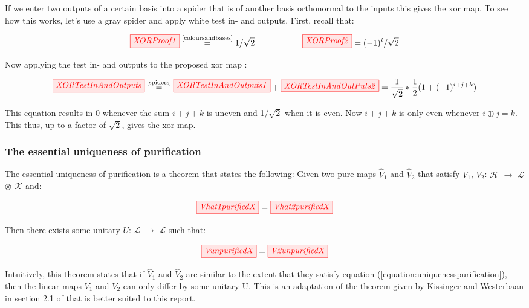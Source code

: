\documentclass[]{article}
\newcommand{\equaltext}[1]{\ensuremath{\stackrel{\text{#1}}{=}}}
\begin{document}
If we enter two outputs of a certain basis into a spider that is of another basis orthonormal to the inputs this gives the xor map. To see how this works, let's use a gray spider and apply white test in- and outputs. First, recall that:

\begin{equation}
	\tikzfig{XORProof1} \equaltext{\ref{coloursandbases}} 1/\sqrt{2} ~~~~~~~~~~~~~~~~~ \tikzfig{XORProof2} = (-1)^i/\sqrt{2}
\end{equation}

Now applying the test in- and outputs to the proposed xor map \cite{Coecke2017}:

\begin{equation}
	\label{equation:xormap}
	\tikzfig{XORTestInAndOutputs} \equaltext{\ref{spiders}} \tikzfig{XORTestInAndOutputs1} + \tikzfig{XORTestInAndOutPuts2} = \frac{1}{\sqrt{2}} * \frac{1}{2}(1+(-1)^{i+j+k})
\end{equation}

This equation results in 0 whenever the sum $i+j+k$ is uneven and 1/$\sqrt{2}$ when it is even. Now $i+j+k$ is only even whenever $i \oplus j = k$. This thus, up to a factor of $\sqrt{2}$, gives the xor map.

\subsubsection{The essential uniqueness of purification}
\label{section:essentialuniqueness}

The essential uniqueness of purification is a theorem that states the following: Given two pure maps $\hat{V}_1$ and $\hat{V}_2$ that satisfy $V_1$, $V_2$: $\mathcal{H}$ $\rightarrow$ $\mathcal{L}$ $\otimes$ $\mathcal{K}$ and:

\begin{equation}
	\label{equation:uniquenesspurification}
	\tikzfig{Vhat1purifiedX} = \tikzfig{Vhat2purifiedX}
\end{equation}

Then there exists some unitary $U$: $\mathcal{L}$ $\rightarrow$ $\mathcal{L}$ such that:

\begin{equation}
	\tikzfig{VunpurifiedX} = \tikzfig{V2unpurifiedX}
\end{equation}

Intuitively, this theorem states that if $\hat{V}_1$ and $\hat{V}_2$ are similar to the extent that they satisfy equation (\ref{equation:uniquenesspurification}), then the linear maps $V_1$ and $V_2$ can only differ by some unitary U. This is an adaptation of the theorem given by Kissinger and Westerbaan in section 2.1 of \cite{Kissinger2017} that is better suited to this report.
\end{document}
